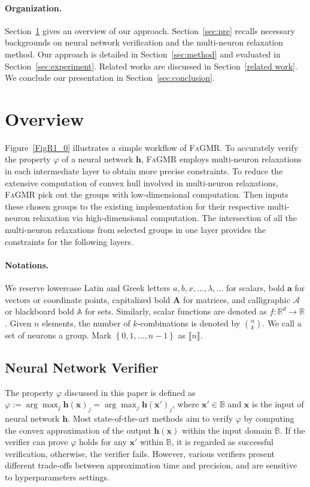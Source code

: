 \documentclass[runningheads]{llncs}
\newcommand{\ourtool}{\textsc{FaGMR}\xspace}
\newcommand{\myvec}[1]{\boldsymbol{#1}}
\newcommand{\mymatrix}[1]{\boldsymbol{#1}}
\newcommand{\combin}[2]{\binom{#1}{#2}}
\begin{document}
\paragraph{Organization.}
Section~\ref{overview} gives an overview of our approach.
Section~\ref{sec:pre} recalls necessary backgrounds on neural network
verification and the multi-neuron relaxation method. Our approach is
detailed in Section~\ref{sec:method} and evaluated in
Section~\ref{sec:experiment}. Related works are discussed in
Section~\ref{related work}. We conclude our presentation in
Section~\ref{sec:conclusion}.
%
%
%

\section{Overview}\label{overview}

Figure~\ref{FigR1_0} illustrates a simple workflow of \ourtool. To accurately verify the property $\varphi$ of a neural network $\myvec{h}$, \ourtool employs multi-neuron relaxations in each intermediate layer to obtain more precise constraints. To reduce the extensive computation of convex hull involved in multi-neuron relaxations, \ourtool pick out the groups with low-dimensional computation. Then inputs these chosen groups to the existing implementation for their respective multi-neuron relaxation via high-dimensional computation. The intersection of all the multi-neuron relaxations from selected groups in one layer provides the constraints for the following layers. 
%
%
%

\paragraph{Notations.} 
We reserve lowercase Latin and Greek letters $a, b, x, \dots, \lambda,
\dots$ for scalars, bold $\myvec{a}$ for vectors or coordinate points, capitalized bold
$\mymatrix{A}$ for matrices, and calligraphic $\mathcal{A}$ or
blackboard bold $\mathbb{A}$ for sets.  Similarly, scalar functions
are denoted as $f:\mathbb{R}^{d} \to \mathbb{R}$. 
Given $n$ elements, the number of $k$-combinations is
denoted by $\combin{n}{k}$. We call a set of neurons a group.
Mark $\left\{ 0,1,...,n-1 \right\}$ as $\llbracket   n  \rrbracket $.
%
%
%
\subsection{Neural Network Verifier}
The property $\varphi$ discussed in this paper is defined as $\varphi := \arg \max_{j} \myvec{h}(\myvec{x})_{j} = \arg \max_{j}
\myvec{h}(\myvec{x}')_{j}$, where $\myvec{x}' \in \mathbb{B}$ and $\myvec{x}$ is the input of neural network $\myvec{h}$. Most state-of-the-art methods aim to verify $\varphi$ by computing the convex approximation of the output $\myvec{h}(\myvec{x})$ within the input domain $\mathbb{B}$. If the verifier can prove $\varphi$ holds for any $\myvec{x}'$ within $\mathbb{B}$, it is regarded as successful verification, otherwise, the verifier fails. However, various verifiers present different trade-offs between approximation time and precision, and are sensitive to hyperparameters settings.
\end{document}
